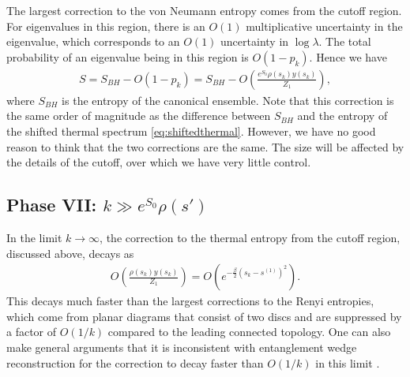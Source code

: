 \documentclass[12pt]{article}
\newcommand{\smax}{s_k}
\newcommand{\sprime}{s'}
\numberwithin{equation}{section}
\begin{document}
The largest correction to the von Neumann entropy comes from the cutoff region. For eigenvalues in this region, there is an $O(1)$ multiplicative uncertainty in the eigenvalue, which corresponds to an $O(1)$ uncertainty in $\log \lambda$. The total probability of an eigenvalue being in this region is $O(1-p_k)$. Hence we have
\begin{align}
S = S_{BH} - O(1-p_k) = S_{BH} - O\left(\frac{e^{S_0} \rho(\smax)y(\smax)}{Z_1}\right),
\end{align}
where $S_{BH}$ is the entropy of the canonical ensemble. Note that this correction is the same order of magnitude as the difference between $S_{BH}$ and the entropy of the shifted thermal spectrum \eqref{eq:shiftedthermal}. However, we have no good reason to think that the two corrections are the same. The size will be affected by the details of the cutoff, over which we have very little control.

\subsection*{Phase VII: $k \gg e^{S_0} \rho(\sprime)$}
In the limit $k \to \infty$, the correction to the thermal entropy from the cutoff region, discussed above, decays as
\begin{align}
O(\frac{\rho(\smax)y(\smax)}{Z_1}) = O(e^{-\frac{\beta}{2}(\smax - s^{(1)})^2}).
\end{align}
This decays much faster than the largest corrections to the Renyi entropies, which come from planar diagrams that consist of two discs and are suppressed by a factor of $O(1/k)$
compared to the leading connected topology. One can also make general arguments that it is inconsistent with entanglement wedge reconstruction for the correction to decay faster than $O(1/k)$ in this limit \cite{Hayden:2018khn}.
\end{document}
